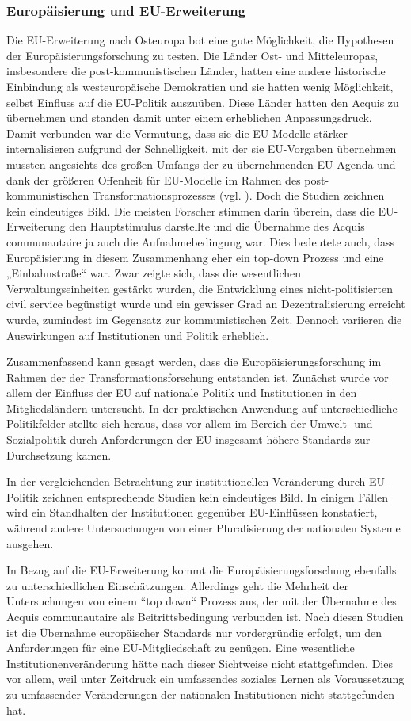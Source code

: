 \subsubsection{Europäisierung und EU-Erweiterung }
Die EU-Erweiterung nach Osteuropa bot eine gute Möglichkeit, die Hypothesen der Europäisierungsforschung zu testen. Die Länder Ost- und Mitteleuropas, insbesondere die post-kommunistischen Länder, hatten eine andere historische Einbindung als westeuropäische Demokratien und sie hatten wenig Möglichkeit, selbst Einfluss auf die EU-Politik auszuüben. Diese Länder hatten den Acquis zu übernehmen und standen damit unter einem erheblichen Anpassungsdruck. Damit verbunden war die Vermutung, dass sie die EU-Modelle stärker internalisieren aufgrund der Schnelligkeit, mit der sie EU-Vorgaben übernehmen mussten angesichts des großen Umfangs der zu übernehmenden EU-Agenda und dank der größeren Offenheit für EU-Modelle im Rahmen des post-kommunistischen Transformationsprozesses (vgl. \cite{grab03}). Doch die Studien zeichnen kein eindeutiges Bild. Die meisten Forscher stimmen darin überein, dass die EU-Erweiterung den Hauptstimulus darstellte und die Übernahme des Acquis communautaire ja auch die Aufnahmebedingung war. Dies bedeutete auch, dass Europäisierung in diesem Zusammenhang eher ein top-down Prozess und eine „Einbahnstraße“ war. Zwar zeigte sich, dass die wesentlichen Verwaltungseinheiten gestärkt wurden, die Entwicklung eines nicht-politisierten civil service begünstigt wurde und ein gewisser Grad an Dezentralisierung erreicht wurde, zumindest im Gegensatz zur kommunistischen Zeit. Dennoch variieren die Auswirkungen auf Institutionen und Politik erheblich.\par
Zusammenfassend kann gesagt werden, dass die Europäisierungsforschung im Rahmen der der Transformationsforschung entstanden ist. Zunächst wurde vor allem der Einfluss der EU auf nationale Politik und Institutionen in den Mitgliedsländern untersucht. In der praktischen Anwendung auf unterschiedliche Politikfelder stellte sich heraus, dass vor allem im Bereich der Umwelt- und Sozialpolitik durch Anforderungen der EU insgesamt höhere Standards zur Durchsetzung kamen.
\par
In der vergleichenden Betrachtung zur institutionellen Veränderung durch EU-Politik zeichnen entsprechende Studien kein eindeutiges Bild. In einigen Fällen wird ein Standhalten der Institutionen gegenüber EU-Einflüssen konstatiert, während andere Untersuchungen von einer Pluralisierung der nationalen Systeme ausgehen.\par
In Bezug auf die EU-Erweiterung kommt die Europäisierungsforschung ebenfalls zu unterschiedlichen Einschätzungen. Allerdings geht die Mehrheit der Untersuchungen von einem “top down“ Prozess aus, der mit der Übernahme des Acquis communautaire als Beitrittsbedingung verbunden ist. Nach diesen Studien ist die Übernahme europäischer Standards nur vordergründig erfolgt, um den Anforderungen für eine EU-Mitgliedschaft zu genügen. Eine wesentliche Institutionenveränderung hätte nach dieser Sichtweise nicht stattgefunden. Dies vor allem, weil unter Zeitdruck ein umfassendes soziales Lernen als Voraussetzung zu umfassender Veränderungen der nationalen Institutionen nicht stattgefunden hat.
